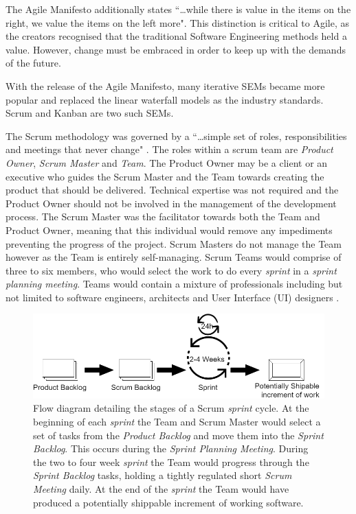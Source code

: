 \documentclass[final]{cmpreport}
\begin{document}
			The Agile Manifesto additionally states ``\ldots while there is value in the items on the right, we value the items on the left more". This distinction is critical to Agile, as the creators recognised that the traditional Software Engineering methods held a value. However, change must be embraced in order to keep up with the demands of the future.
			
			With the release of the Agile Manifesto, many iterative SEMs became more popular and replaced the linear waterfall models as the industry standards. Scrum and Kanban are two such SEMs. 
			
			The Scrum methodology was governed by a ``\ldots simple set of roles, responsibilities and meetings that never change" \citep{scrum-online}. The roles within a scrum team are \emph{Product Owner}, \emph{Scrum Master} and \emph{Team}. The Product Owner may be a client or an executive who guides the Scrum Master and the Team towards creating the product that should be delivered. Technical expertise was not required and the Product Owner should not be involved in the management of the development process. The Scrum Master was the facilitator towards both the Team and Product Owner, meaning that this individual would remove any impediments preventing the progress of the project. Scrum Masters do not manage the Team however as the Team is entirely self-managing. Scrum Teams would comprise of three to six members, who would select the work to do every \emph{sprint} in a \emph{sprint planning meeting}. Teams would contain a mixture of professionals including but not limited to software engineers, architects and User Interface (UI) designers \citep{Scrum}. 
			
			\begin{figure}
				\centering
				\includegraphics[width=0.8\linewidth]{scrum.png}
				\caption[Scrum Methodology Sprint Cycle]{Flow diagram detailing the stages of a Scrum \emph{sprint} cycle. At the beginning of each \emph{sprint} the Team and Scrum Master would select a set of tasks from the \emph{Product Backlog} and move them into the \emph{Sprint Backlog}. This occurs during the \emph{Sprint Planning Meeting}. During the two to four week \emph{sprint} the Team would progress through the \emph{Sprint Backlog} tasks, holding a tightly regulated short \emph{Scrum Meeting} daily. At the end of the \emph{sprint} the Team would have produced a potentially shippable increment of working software.} \label{fig:scrum}
			\end{figure}
		
\end{document}
